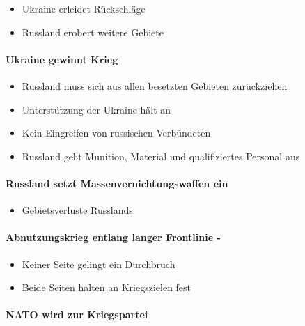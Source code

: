 {}\documentclass[a4paper]{article}
\providecommand{\tightlist}{\setlength{\itemsep}{1mm}\setlength{\parskip}{1mm}}
\begin{document}
\begin{itemize}
	\tightlist
	\item
	      Ukraine erleidet Rückschläge
	\item
	      Russland erobert weitere Gebiete
\end{itemize}

\paragraph{Ukraine gewinnt Krieg}\label{ukraine-gewinnt-krieg}

\begin{itemize}
	\tightlist
	\item
	      Russland muss sich aus allen besetzten Gebieten zurückziehen
	\item
	      Unterstützung der Ukraine hält an
	\item
	      Kein Eingreifen von russischen Verbündeten
	\item
	      Russland geht Munition, Material und qualifiziertes Personal aus
\end{itemize}

\paragraph{Russland setzt Massenvernichtungswaffen
	ein}\label{russland-setzt-massenvernichtungswaffen-ein}

\begin{itemize}
	\tightlist
	\item
	      Gebietsverluste Russlands
\end{itemize}

\paragraph{Abnutzungskrieg entlang langer Frontlinie
	-}\label{abnutzungskrieg-entlang-langer-frontlinie--}

\begin{itemize}
	\tightlist
	\item
	      Keiner Seite gelingt ein Durchbruch
	\item
	      Beide Seiten halten an Kriegszielen fest
\end{itemize}

\paragraph{NATO wird zur Kriegspartei}\label{nato-wird-zur-kriegspartei}
\end{document}
